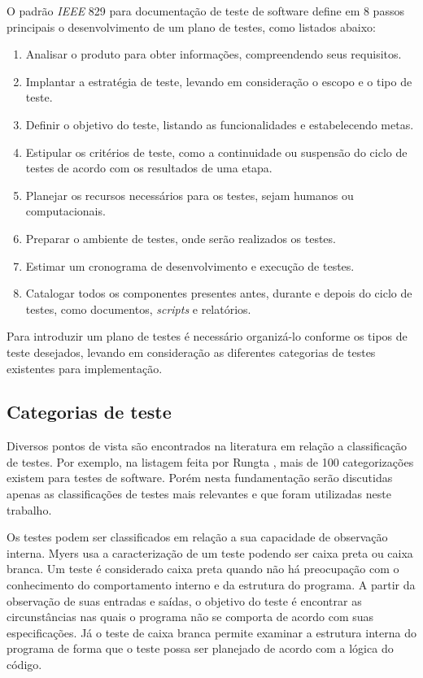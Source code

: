 O padrão \emph{IEEE} 829 \cite{software2008ieee} para documentação de teste de software define em 8 passos principais o desenvolvimento de um plano de testes, como listados abaixo:
\begin{enumerate}
    \item Analisar o produto para obter informações, compreendendo seus requisitos.
    \item Implantar a estratégia de teste, levando em consideração o escopo e o tipo de teste.
    \item Definir o objetivo do teste, listando as funcionalidades e estabelecendo metas.
    \item Estipular os critérios de teste, como a continuidade ou suspensão do ciclo de testes de acordo com os resultados de uma etapa.
    \item Planejar os recursos necessários para os testes, sejam humanos ou computacionais.
    \item Preparar o ambiente de testes, onde serão realizados os testes.
    \item Estimar um cronograma de desenvolvimento e execução de testes.
    \item Catalogar todos os componentes presentes antes, durante e depois do ciclo de testes, como documentos, \emph{scripts} e relatórios.
\end{enumerate}

Para introduzir um plano de testes é necessário organizá-lo conforme os tipos de teste desejados, levando em consideração as diferentes categorias de testes existentes para implementação.

\hypertarget{categorias-de-teste}{%
\subsection{Categorias de teste}\label{categorias-de-teste}}

Diversos pontos de vista são encontrados na literatura em relação a classificação de testes. Por exemplo, na listagem feita por Rungta \cite{rungta}, mais de 100 categorizações existem para testes de software. Porém nesta fundamentação serão discutidas apenas as classificações de testes mais relevantes e que foram utilizadas neste trabalho.

Os testes podem ser classificados em relação a sua capacidade de observação interna. Myers \cite{myers} usa a caracterização de um teste podendo ser caixa preta ou caixa branca. Um teste é considerado caixa preta quando não há preocupação com o conhecimento do comportamento interno e da estrutura do programa. A partir da observação de suas entradas e saídas, o objetivo do teste é encontrar as circunstâncias nas quais o programa não se comporta de acordo com suas especificações. Já o teste de caixa branca permite examinar a estrutura interna do programa de forma que o teste possa ser planejado de acordo com a lógica do código.

